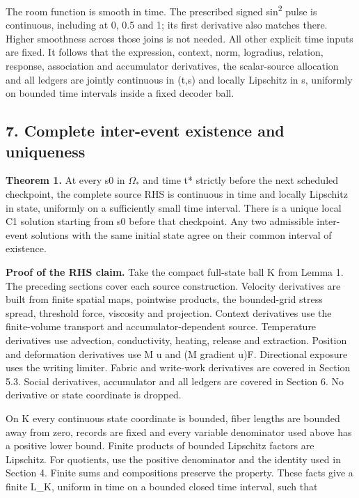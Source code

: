 \documentclass[11pt,a4paper]{article}
\begin{document}
The room function is smooth in time. The prescribed signed sin\textsuperscript{2} pulse is continuous, including at 0, 0.5 and 1; its first derivative also matches there. Higher smoothness across those joins is not needed. All other explicit time inputs are fixed. It follows that the expression, context, norm, logradius, relation, response, association and accumulator derivatives, the scalar-source allocation and all ledgers are jointly continuous in (t,s) and locally Lipschitz in s, uniformly on bounded time intervals inside a fixed decoder ball.

\subsection*{7. Complete inter-event existence and uniqueness}

\textbf{Theorem 1.} At every s0 in \(\Omega_*\) and time t* strictly before the next scheduled checkpoint, the complete source RHS is continuous in time and locally Lipschitz in state, uniformly on a sufficiently small time interval. There is a unique local C1 solution starting from s0 before that checkpoint. Any two admissible inter-event solutions with the same initial state agree on their common interval of existence.

\textbf{Proof of the RHS claim.} Take the compact full-state ball K from Lemma 1. The preceding sections cover each source construction. Velocity derivatives are built from finite spatial maps, pointwise products, the bounded-grid stress spread, threshold force, viscosity and projection. Context derivatives use the finite-volume transport and accumulator-dependent source. Temperature derivatives use advection, conductivity, heating, release and extraction. Position and deformation derivatives use M u and (M gradient u)F. Directional exposure uses the writing limiter. Fabric and write-work derivatives are covered in Section 5.3. Social derivatives, accumulator and all ledgers are covered in Section 6. No derivative or state coordinate is dropped.

On K every continuous state coordinate is bounded, fiber lengths are bounded away from zero, records are fixed and every variable denominator used above has a positive lower bound. Finite products of bounded Lipschitz factors are Lipschitz. For quotients, use the positive denominator and the identity used in Section 4. Finite sums and compositions preserve the property. These facts give a finite L\_K, uniform in time on a bounded closed time interval, such that
\end{document}
